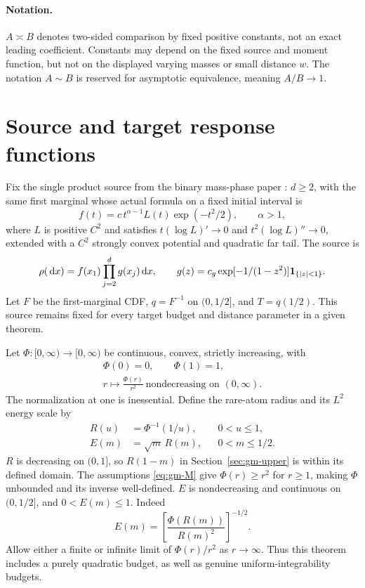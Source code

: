 \paragraph{Notation.} \(A\asymp B\) denotes two-sided comparison by fixed positive constants, not an exact leading coefficient. Constants may depend on the fixed source and moment function, but not on the displayed varying masses or small distance \(w\). The notation \(A\sim B\) is reserved for asymptotic equivalence, meaning \(A/B\to1\).

\section{Source and target response functions}\label{sec:gm-source}

Fix the single product source from the binary mass-phase paper \cite{binary}: \(d\ge2\), with the same first marginal whose actual formula on a fixed initial interval is
\[
 f(t)=c\,t^{\alpha-1}L(t)\exp(-t^2/2),\qquad \alpha>1,
\]
where \(L\) is positive \(C^2\) and satisfies \(t(\log L)'\to0\) and \(t^2(\log L)''\to0\), extended with a \(C^2\) strongly convex potential and quadratic far tail. The source is
\[
 \rho(\,\mathrm d x)=f(x_1)\prod_{j=2}^d g(x_j)\,\mathrm d x,
 \qquad g(z)=c_g\exp[-1/(1-z^2)]\mathbf 1_{\{|z|<1\}}.
\]
 Let \(F\) be the first-marginal CDF, \(q=F^{-1}\) on \((0,1/2]\), and \(T=q(1/2)\). This source remains fixed for every target budget and distance parameter in a given theorem.

Let \(\Phi:[0,\infty)\to[0,\infty)\) be continuous, convex, strictly increasing, with
\begin{equation}
 \begin{gathered}
 \Phi(0)=0,\qquad \Phi(1)=1,\\
 r\longmapsto\frac{\Phi(r)}{r^2}\ \text{nondecreasing on }(0,\infty).
 \end{gathered}
 \tag{M}\label{eq:gm-M}
\end{equation}
The normalization at one is inessential. Define the rare-atom radius and its \(L^2\) energy scale by
\begin{equation}
 \begin{aligned}
 R(u)&=\Phi^{-1}(1/u), &&0<u\le1,\\
 E(m)&=\sqrt m\,R(m), &&0<m\le1/2.
 \end{aligned}
 \tag{1.1}\label{eq:gm-response}
\end{equation}
\(R\) is decreasing on \((0,1]\), so \(R(1-m)\) in Section~\ref{sec:gm-upper} is within its defined domain. The assumptions \eqref{eq:gm-M} give \(\Phi(r)\ge r^2\) for \(r\ge1\), making \(\Phi\) unbounded and its inverse well-defined. \(E\) is nondecreasing and continuous on \((0,1/2]\), and \(0<E(m)\le1\). Indeed
\[
 E(m)=\left[\frac{\Phi(R(m))}{R(m)^2}\right]^{-1/2}.
\]
Allow either a finite or infinite limit of \(\Phi(r)/r^2\) as \(r\to\infty\). Thus this theorem includes a purely quadratic budget, as well as genuine uniform-integrability budgets.

